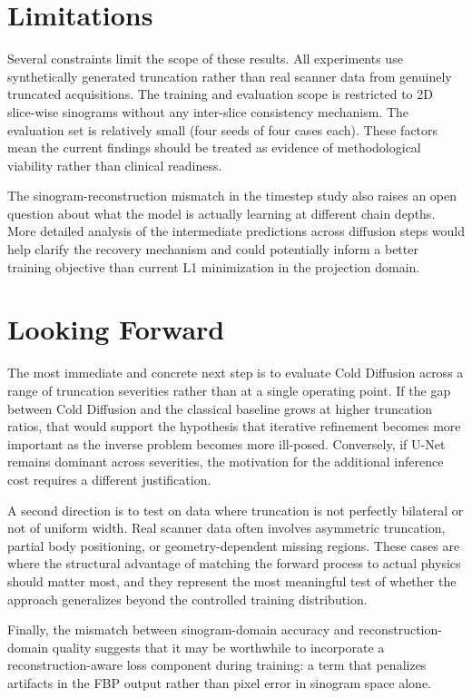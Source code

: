 \section{Limitations}

Several constraints limit the scope of these results. All experiments use synthetically generated truncation rather than real scanner data from genuinely truncated acquisitions. The training and evaluation scope is restricted to 2D slice-wise sinograms without any inter-slice consistency mechanism. The evaluation set is relatively small (four seeds of four cases each). These factors mean the current findings should be treated as evidence of methodological viability rather than clinical readiness.

The sinogram-reconstruction mismatch in the timestep study also raises an open question about what the model is actually learning at different chain depths. More detailed analysis of the intermediate predictions across diffusion steps would help clarify the recovery mechanism and could potentially inform a better training objective than current L1 minimization in the projection domain.

\section{Looking Forward}

The most immediate and concrete next step is to evaluate Cold Diffusion across a range of truncation severities rather than at a single operating point. If the gap between Cold Diffusion and the classical baseline grows at higher truncation ratios, that would support the hypothesis that iterative refinement becomes more important as the inverse problem becomes more ill-posed. Conversely, if U-Net remains dominant across severities, the motivation for the additional inference cost requires a different justification.

A second direction is to test on data where truncation is not perfectly bilateral or not of uniform width. Real scanner data often involves asymmetric truncation, partial body positioning, or geometry-dependent missing regions. These cases are where the structural advantage of matching the forward process to actual physics should matter most, and they represent the most meaningful test of whether the approach generalizes beyond the controlled training distribution.

Finally, the mismatch between sinogram-domain accuracy and reconstruction-domain quality suggests that it may be worthwhile to incorporate a reconstruction-aware loss component during training: a term that penalizes artifacts in the FBP output rather than pixel error in sinogram space alone.

